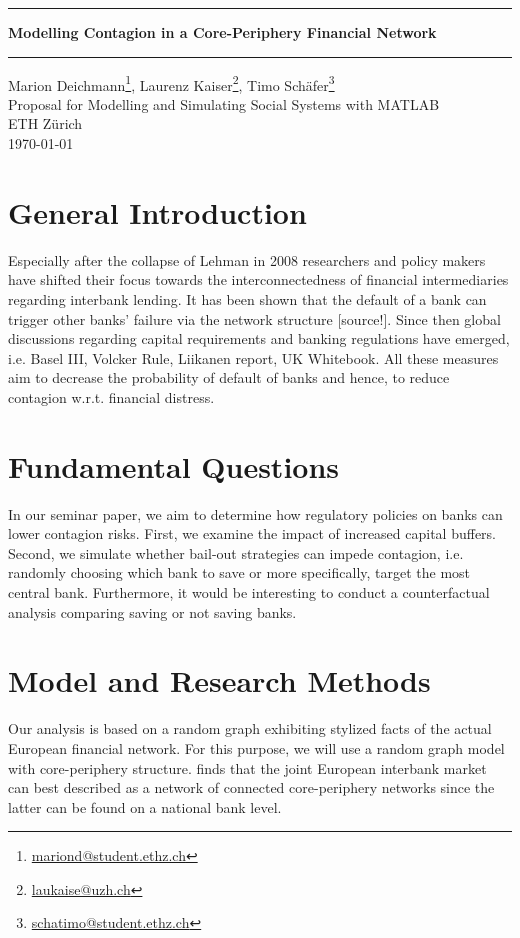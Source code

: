 \documentclass[12pt,a4paper,oneside]{article} %
\begin{document}
\begin{center}
\hrule \vspace{0.4cm}
{\LARGE \bfseries Modelling Contagion in a Core-Periphery
  Financial Network \\[0.4cm] } 
\hrule \vspace{0.4cm} 
Marion Deichmann\footnote{\href{mailto:mariond@student.ethz.ch}{mariond@student.ethz.ch}},
  Laurenz Kaiser\footnote{\href{mailto:laukaise@uzh.ch}{laukaise@uzh.ch}},
  Timo Schäfer\footnote{\href{mailto:schatimo@student.ethz.ch}{schatimo@student.ethz.ch}} \\[0.1cm]
Proposal for Modelling and Simulating Social Systems with MATLAB \\[0.1cm] ETH Zürich \\[0.1cm] \today 
\end{center}

\section*{General Introduction}
\noindent Especially after the collapse of Lehman in 2008 researchers and policy
makers have shifted their focus towards the interconnectedness of
financial intermediaries regarding interbank lending. It has been shown that the default of a bank
can trigger other banks' failure via the network structure [source!]. Since then global discussions regarding
capital requirements and banking regulations have emerged, i.e. Basel III, Volcker Rule, Liikanen
report, UK Whitebook. All these measures aim to decrease the
probability of default of banks and hence, to reduce contagion
w.r.t. financial distress.

\section*{Fundamental Questions}
In our seminar paper, we aim to determine how regulatory policies
on banks can lower contagion risks. First, we examine the impact of
increased capital buffers. Second, we simulate whether bail-out
strategies can impede contagion, i.e. randomly choosing which bank to
save or more specifically, target the most central bank. Furthermore,
it would be interesting to conduct a counterfactual analysis comparing
saving or not saving banks.

\section*{Model and Research Methods}
Our analysis is based on a random graph exhibiting stylized facts of the
actual European financial network. For this purpose, we will use a
\cite{Erdos1959} random graph model with core-periphery
structure. \cite{Georg2014} finds that the joint European interbank market
can best described as a network of connected core-periphery networks
since the latter can be found on a national bank level. 
\end{document}
